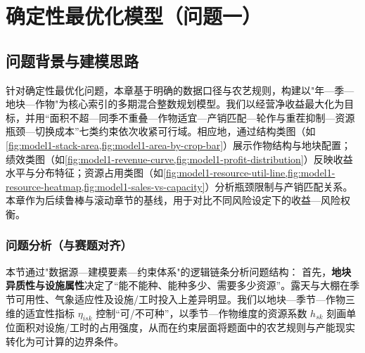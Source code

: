 \graphicspath{{figures/}{../figures/}}
\section{确定性最优化模型（问题一）}
 
\subsection{问题背景与建模思路}
针对确定性最优化问题，本章基于明确的数据口径与农艺规则，构建以"年—季—地块—作物"为核心索引的多期混合整数规划模型。我们以经营净收益最大化为目标，并用“面积不超—同季不重叠—作物适宜—产销匹配—轮作与重茬抑制—资源瓶颈—切换成本”七类约束依次收紧可行域。相应地，通过结构类图（如\cref{fig:model1-stack-area,fig:model1-area-by-crop-bar}）展示作物结构与地块配置；绩效类图（如\cref{fig:model1-revenue-curve,fig:model1-profit-distribution}）反映收益水平与分布特征；资源占用类图（如\cref{fig:model1-resource-util-line,fig:model1-resource-heatmap,fig:model1-sales-vs-capacity}）分析瓶颈限制与产销匹配关系。本章作为后续鲁棒与滚动章节的基线，用于对比不同风险设定下的收益—风险权衡。

\subsubsection{问题分析（与赛题对齐）}
本节通过"数据源—建模要素—约束体系"的逻辑链条分析问题结构：
首先，\textbf{地块异质性与设施属性}决定了“能不能种、能种多少、需要多少资源”。露天与大棚在季节可用性、气象适应性及设施/工时投入上差异明显。我们以地块—季节—作物三维的适宜性指标 $\eta_{isk}$ 控制“可/不可种”，以季节—作物维度的资源系数 $h_{sk}$ 刻画单位面积对设施/工时的占用强度，从而在约束层面将题面中的农艺规则与产能现实转化为可计算的边界条件。

